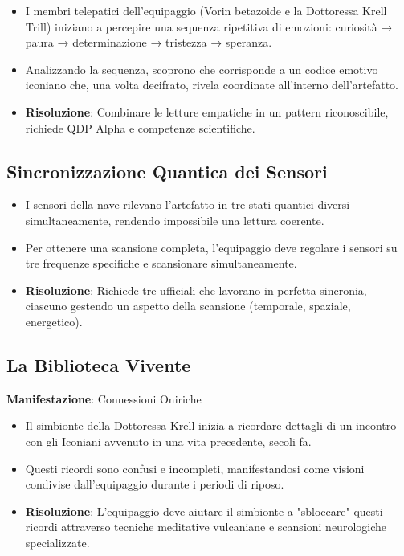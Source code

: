 \documentclass[letterpaper,twocolumn,openany,nodeprecatedcode]{dndbook}
\begin{document}
\begin{itemize}
    \item I membri telepatici dell'equipaggio (Vorin betazoide e la Dottoressa Krell Trill) iniziano a percepire una sequenza ripetitiva di emozioni: curiosità → paura → determinazione → tristezza → speranza.
    \item Analizzando la sequenza, scoprono che corrisponde a un codice emotivo iconiano che, una volta decifrato, rivela coordinate all'interno dell'artefatto.
    \item \textbf{Risoluzione}: Combinare le letture empatiche in un pattern riconoscibile, richiede QDP Alpha e competenze scientifiche.
\end{itemize}

\subsection{Sincronizzazione Quantica dei Sensori}

\begin{itemize}
    \item I sensori della nave rilevano l'artefatto in tre stati quantici diversi simultaneamente, rendendo impossibile una lettura coerente.
    \item Per ottenere una scansione completa, l'equipaggio deve regolare i sensori su tre frequenze specifiche e scansionare simultaneamente.
    \item \textbf{Risoluzione}: Richiede tre ufficiali che lavorano in perfetta sincronia, ciascuno gestendo un aspetto della scansione (temporale, spaziale, energetico).
\end{itemize}

\subsection{La Biblioteca Vivente}
\textbf{Manifestazione}: Connessioni Oniriche

\begin{itemize}
    \item Il simbionte della Dottoressa Krell inizia a ricordare dettagli di un incontro con gli Iconiani avvenuto in una vita precedente, secoli fa.
    \item Questi ricordi sono confusi e incompleti, manifestandosi come visioni condivise dall'equipaggio durante i periodi di riposo.
    \item \textbf{Risoluzione}: L'equipaggio deve aiutare il simbionte a "sbloccare" questi ricordi attraverso tecniche meditative vulcaniane e scansioni neurologiche specializzate.
\end{itemize}
\end{document}
